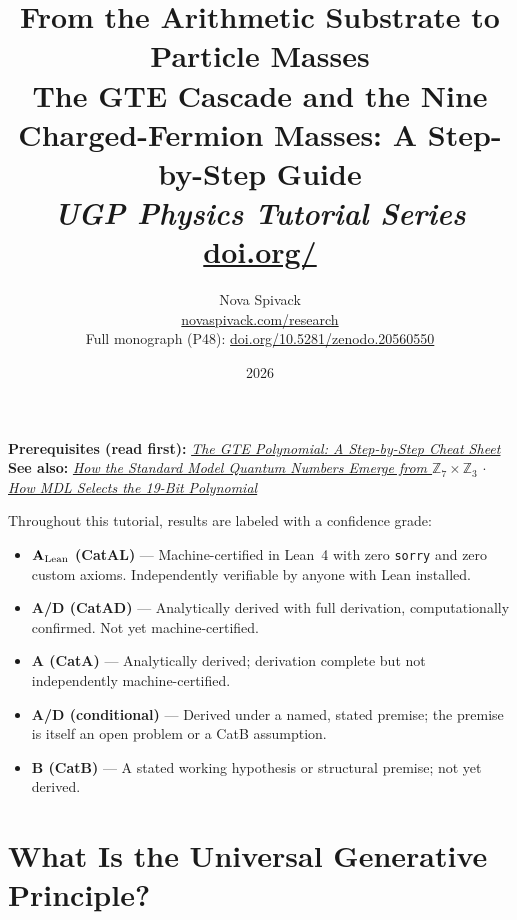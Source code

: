 \documentclass[11pt,a4paper]{article}
\title{\textbf{From the Arithmetic Substrate to Particle Masses}\\[6pt]
\large The GTE Cascade and the Nine Charged-Fermion Masses: A Step-by-Step Guide\\[4pt]\normalsize\textit{UGP Physics Tutorial Series}
\\[2pt]\small\href{https://doi.org/\TutorialDOI}{doi.org/\TutorialDOI}}
\author{Nova Spivack\\[4pt]
\normalsize
\href{https://novaspivack.com/research}{novaspivack.com/research}\\[2pt]
\small Full monograph (P48):
\href{https://doi.org/10.5281/zenodo.20560550}{doi.org/10.5281/zenodo.20560550}
}
\date{2026}
\begin{document}
\setcounter{tocdepth}{2}
\maketitle
\tableofcontents
\newpage

\begin{tcolorbox}[colback=blue!6,colframe=blue!40!black,
  title=\textbf{UGP Physics Tutorial Series}]
\textbf{Prerequisites (read first):} \href{https://doi.org/10.5281/zenodo.20657889}{\emph{The GTE Polynomial: A Step-by-Step Cheat Sheet}}\\[4pt]
\textbf{See also:} \href{https://doi.org/10.5281/zenodo.20657898}{\emph{How the Standard Model Quantum Numbers Emerge from $\mathbb{Z}_7\times\mathbb{Z}_3$}} $\cdot$
\href{https://doi.org/10.5281/zenodo.20657876}{\emph{How MDL Selects the 19-Bit Polynomial}}
\end{tcolorbox}

\begin{tcolorbox}[colback=boxgreen,colframe=green!50!black,
  title=\textbf{Claim-Strength Taxonomy}]
Throughout this tutorial, results are labeled with a confidence grade:
\begin{itemize}[itemsep=2pt]
  \item \textbf{$\mathbf{A}_{\rm Lean}$ (CatAL)} --- Machine-certified in Lean~4 with zero \texttt{sorry} and zero custom axioms.  Independently verifiable by anyone with Lean installed.
  \item \textbf{A/D (CatAD)} --- Analytically derived with full derivation, computationally confirmed.  Not yet machine-certified.
  \item \textbf{A (CatA)} --- Analytically derived; derivation complete but not independently machine-certified.
  \item \textbf{A/D (conditional)} --- Derived under a named, stated premise; the premise is itself an open problem or a CatB assumption.
  \item \textbf{B (CatB)} --- A stated working hypothesis or structural premise; not yet derived.
\end{itemize}
\end{tcolorbox}


\section{What Is the Universal Generative Principle?}
\label{sec:ugp}
\end{document}
